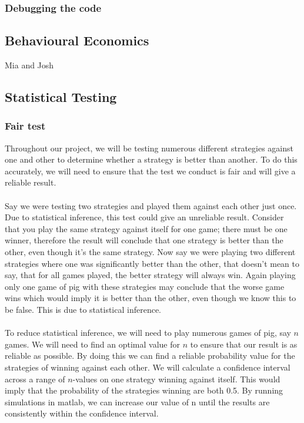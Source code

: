 \documentclass[a4paper,titlepage]{article}
\begin{document}
\subsubsection{Debugging the code}



\subsection{Behavioural Economics}
Mia and Josh

\subsection{Statistical Testing}
\subsubsection{Fair test}
Throughout our project, we will be testing numerous different strategies against one and other to determine whether a strategy is better than another. To do this accurately, we will need to ensure that the test we conduct is fair and will give a reliable result.\\ \\
Say we were testing two strategies and played them against each other just once. Due to statistical inference, this test could give an unreliable result. Consider that you play the same strategy against itself for one game; there must be one winner, therefore the result will conclude that one strategy is better than the other, even though it’s the same strategy. Now say we were playing two different strategies where one was significantly better than the other, that doesn’t mean to say, that for all games played, the better strategy will always win. Again playing only one game of pig with these strategies may conclude that the worse game wins which would imply it is better than the other, even though we know this to be false. This is due to statistical inference.\\ \\
To reduce statistical inference, we will need to play numerous games of pig, say $n$ games. We will need to find an optimal value for $n$ to ensure that our result is as reliable as possible. By doing this we can find a reliable probability value for the strategies of winning against each other. We will calculate a confidence interval across a range of $n$-values on one strategy winning against itself. This would imply that the probability of the strategies winning are both 0.5. By running simulations in matlab, we can increase our value of n until the results are consistently within the confidence interval. 
\end{document}
